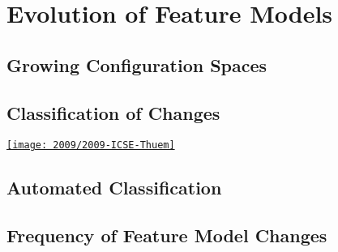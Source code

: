 \faq{
	\item \ldots
}{
	\item \ldots
}{
	\item \ldots
}





\author{Thomas Thüm, Elias Kuiter, Timo Kehrer}

\section{Evolution of Feature Models}
\subsection{Growing Configuration Spaces}
\subsection{Classification of Changes}
\begin{frame}{\insertsubsection}
	\begin{mycolumns}
		\href{https://github.com/SoftVarE-Group/Papers/blob/main/2009/2009-ICSE-Thuem.pdf}{\texttt{[image: 2009/2009-ICSE-Thuem]}}
	\mynextcolumn
	\end{mycolumns}
\end{frame}
\subsection{Automated Classification}
\subsection{Frequency of Feature Model Changes}
